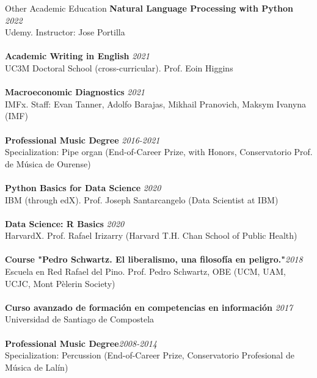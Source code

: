 \documentclass{resume} %
\begin{document}
\vspace{2em}

\begin{rSection}{Other Academic Education}
	{\bf Natural Language Processing with Python} \hfill {\em 2022}
	\\ Udemy. Instructor: Jose Portilla \\
	\\{\bf Academic Writing in English} \hfill {\em 2021}
	\\ UC3M Doctoral School (cross-curricular). Prof. Eoin Higgins \\
	\\{\bf Macroeconomic Diagnostics} \hfill {\em 2021}
	\\ IMFx. Staff: Evan Tanner, Adolfo Barajas, Mikhail Pranovich, Maksym Ivanyna (IMF) \\
	\\{\bf Professional Music Degree }\hfill {\em 2016-2021}\\
	Specialization: Pipe organ (End-of-Career Prize, with Honors, Conservatorio Prof. de Música de Ourense)\\
	\\ {\bf Python Basics for Data Science} \hfill {\em 2020} 
	\\ IBM (through edX). Prof. Joseph Santarcangelo (Data Scientist at IBM) \\
	\\ {\bf Data Science: R Basics} \hfill {\em 2020}
	\\ HarvardX. Prof. Rafael Irizarry (Harvard T.H. Chan School of Public Health) \\
	\\{\bf Course "Pedro Schwartz. El liberalismo, una filosofía en peligro."}\hfill {\em 2018}\\
	Escuela en Red Rafael del Pino. Prof. Pedro Schwartz, OBE (UCM, UAM, UCJC, Mont Pèlerin Society)\\
	\\ {\bf Curso avanzado de formación en competencias en información} \hfill {\em 2017}
	\\Universidad de Santiago de Compostela\\
	\\{\bf Professional Music Degree}\hfill {\em 2008-2014}\\
	Specialization: Percussion (End-of-Career Prize, Conservatorio Profesional de Música de Lalín)
\end{rSection}

\vspace{2em}
\newpage
\end{document}
